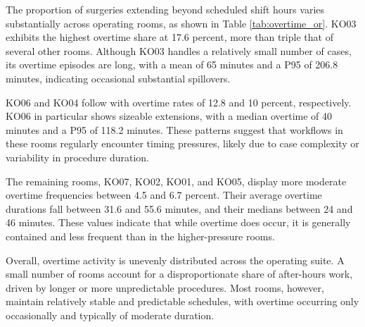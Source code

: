 \documentclass[
]{article}
\begin{document}
The proportion of surgeries extending beyond scheduled shift hours
varies substantially across operating rooms, as shown in Table
\ref{tab:overtime_or}. KO03 exhibits the highest overtime share at 17.6
percent, more than triple that of several other rooms. Although KO03
handles a relatively small number of cases, its overtime episodes are
long, with a mean of 65 minutes and a P95 of 206.8 minutes, indicating
occasional substantial spillovers.

KO06 and KO04 follow with overtime rates of 12.8 and 10 percent,
respectively. KO06 in particular shows sizeable extensions, with a
median overtime of 40 minutes and a P95 of 118.2 minutes. These patterns
suggest that workflows in these rooms regularly encounter timing
pressures, likely due to case complexity or variability in procedure
duration.

The remaining rooms, KO07, KO02, KO01, and KO05, display more moderate
overtime frequencies between 4.5 and 6.7 percent. Their average overtime
durations fall between 31.6 and 55.6 minutes, and their medians between
24 and 46 minutes. These values indicate that while overtime does occur,
it is generally contained and less frequent than in the higher-pressure
rooms.

Overall, overtime activity is unevenly distributed across the operating
suite. A small number of rooms account for a disproportionate share of
after-hours work, driven by longer or more unpredictable procedures.
Most rooms, however, maintain relatively stable and predictable
schedules, with overtime occurring only occasionally and typically of
moderate duration.
\end{document}
